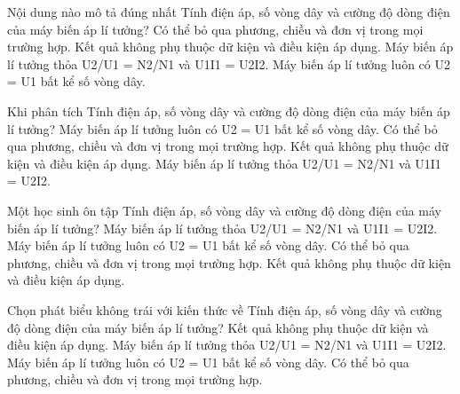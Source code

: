 \begin{ex}
Nội dung nào mô tả đúng nhất Tính điện áp, số vòng dây và cường độ dòng điện của máy biến áp lí tưởng?
\choice
{Có thể bỏ qua phương, chiều và đơn vị trong mọi trường hợp.}
{Kết quả không phụ thuộc dữ kiện và điều kiện áp dụng.}
{\True Máy biến áp lí tưởng thỏa U2/U1 = N2/N1 và U1I1 = U2I2.}
{Máy biến áp lí tưởng luôn có U2 = U1 bất kể số vòng dây.}
\end{ex}

\begin{ex}
Khi phân tích Tính điện áp, số vòng dây và cường độ dòng điện của máy biến áp lí tưởng?
\choice
{Máy biến áp lí tưởng luôn có U2 = U1 bất kể số vòng dây.}
{Có thể bỏ qua phương, chiều và đơn vị trong mọi trường hợp.}
{Kết quả không phụ thuộc dữ kiện và điều kiện áp dụng.}
{\True Máy biến áp lí tưởng thỏa U2/U1 = N2/N1 và U1I1 = U2I2.}
\end{ex}

\begin{ex}
Một học sinh ôn tập Tính điện áp, số vòng dây và cường độ dòng điện của máy biến áp lí tưởng?
\choice
{\True Máy biến áp lí tưởng thỏa U2/U1 = N2/N1 và U1I1 = U2I2.}
{Máy biến áp lí tưởng luôn có U2 = U1 bất kể số vòng dây.}
{Có thể bỏ qua phương, chiều và đơn vị trong mọi trường hợp.}
{Kết quả không phụ thuộc dữ kiện và điều kiện áp dụng.}
\end{ex}

\begin{ex}
Chọn phát biểu không trái với kiến thức về Tính điện áp, số vòng dây và cường độ dòng điện của máy biến áp lí tưởng?
\choice
{Kết quả không phụ thuộc dữ kiện và điều kiện áp dụng.}
{\True Máy biến áp lí tưởng thỏa U2/U1 = N2/N1 và U1I1 = U2I2.}
{Máy biến áp lí tưởng luôn có U2 = U1 bất kể số vòng dây.}
{Có thể bỏ qua phương, chiều và đơn vị trong mọi trường hợp.}
\end{ex}

